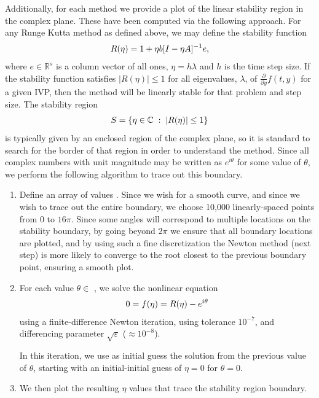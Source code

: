 \documentclass[letterpaper,10pt,english]{sphinxmanual}
\begin{document}
Additionally, for each method we provide a plot of the linear
stability region in the complex plane.  These have been computed via
the following approach.  For any Runge Kutta method as defined above,
we may define the stability function
\begin{gather}
\begin{split}R(\eta) = 1 + \eta b [I - \eta A]^{-1} e,\end{split}\notag
\end{gather}
where \(e\in\mathbb{R}^s\) is a column vector of all ones, \(\eta =
h\lambda\) and \(h\) is the time step size.  If the stability
function satisfies \(|R(\eta)| \le 1\) for all eigenvalues,
\(\lambda\), of \(\frac{\partial }{\partial y}f(t,y)\) for a
given IVP, then the method will be linearly stable for that problem
and step size.  The stability region
\begin{gather}
\begin{split}S = \{ \eta\in\mathbb{C}\; :\; \left| R(\eta) \right| \le 1\}\end{split}\notag
\end{gather}
is typically given by an enclosed region of the complex plane, so it
is standard to search for the border of that region in order to
understand the method.  Since all complex numbers with unit magnitude
may be written as \(e^{i\theta}\) for some value of \(\theta\),
we perform the following algorithm to trace out this boundary.
\begin{enumerate}
\item {} 
Define an array of values .  Since we wish for a
smooth curve, and since we wish to trace out the entire boundary,
we choose 10,000 linearly-spaced points from 0 to \(16\pi\).
Since some angles will correspond to multiple locations on the
stability boundary, by going beyond \(2\pi\) we ensure that all
boundary locations are plotted, and by using such a fine
discretization the Newton method (next step) is more likely to
converge to the root closest to the previous boundary point,
ensuring a smooth plot.

\item {} 
For each value \(\theta \in\) , we solve the nonlinear
equation
\begin{gather}
\begin{split}0 = f(\eta) = R(\eta) - e^{i\theta}\end{split}\notag
\end{gather}
using a finite-difference Newton iteration, using tolerance
\(10^{-7}\), and differencing parameter
\(\sqrt{\varepsilon}\) (\(\approx 10^{-8}\)).

In this iteration, we use as initial guess the solution from the
previous value of \(\theta\), starting with an initial-initial
guess of \(\eta=0\) for \(\theta=0\).

\item {} 
We then plot the resulting \(\eta\) values that trace the
stability region boundary.

\end{enumerate}
\end{document}
